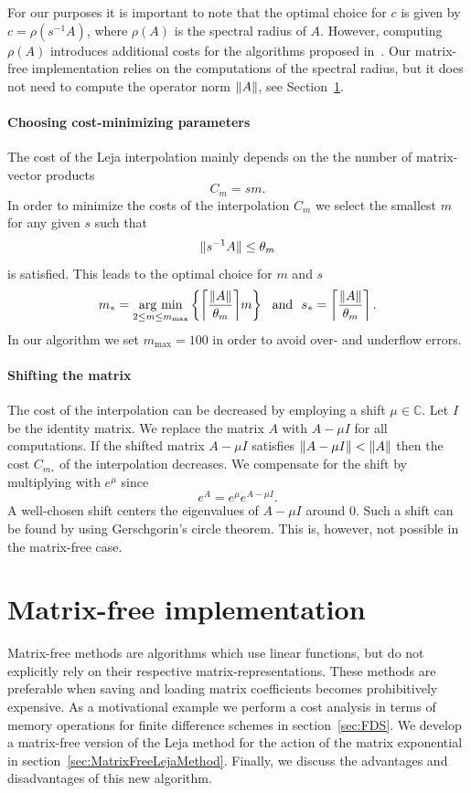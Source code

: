 \documentclass{scrartcl}
\begin{document}
	For our purposes it is important to note that the optimal choice for $c$ is given by $c=\rho(s^{-1}A)$, where $\rho(A)$ is the spectral radius of $A$. However, computing $\rho(A)$ introduces additional costs for the algorithms proposed in~\cite{lejarev}. Our matrix-free implementation relies on the computations of the spectral radius, but it does not need to compute the operator norm $\lVert A\rVert$, see Section~\ref{sec:matrixfreeimplementation}.
	
	\paragraph{Choosing cost-minimizing parameters}
	The cost of the Leja interpolation mainly depends on the the number of matrix-vector products
	\[
	C_{m} = sm. 
	\]
	In order to minimize the costs of the interpolation $C_m$ we select the smallest $m$ for any given $s$ such that
	\[
	\lVert s^{-1}A\rVert \le \theta_m
	\]
	is satisfied. This leads to the optimal choice for $m$ and $s$ 
	\begin{align}
	\begin{split}
	m_* = \underset{2\le m\le m_{\operatorname{max}}}{\operatorname{arg\ min}}  \left\{{\left\lceil{\frac{\norm{A}}{\theta_m}}\right\rceil}m\right\} ~~\text{and}~~
	s_* =  \left\lceil{\frac{\norm{A}}{\theta_m}}\right\rceil.
	\end{split} \label{eq:ms}
	\end{align}
	In our algorithm we set $m_{\operatorname{max}} = 100$ in order to avoid over- and underflow errors.
	
	\paragraph{Shifting the matrix}
	The cost of the interpolation can be decreased by employing a shift $\mu\in\mathbb{C}$. Let $I$ be the identity matrix. We replace the matrix $A$ with $A-\mu I$ for all computations. If the shifted matrix $A-\mu I$ satisfies $\lVert A -\mu I\rVert < \lVert A\rVert$ then the cost $C_{m_*}$ of the interpolation decreases.
	We compensate for the shift by multiplying with $e^\mu$ since
	\[
	e^{A} = e^{\mu}e^{A-\mu I}.
	\]
	A well-chosen shift centers the eigenvalues of $A-\mu I$ around $0$. Such a shift can be found by using Gerschgorin's circle theorem. This is, however, not possible in the matrix-free case.
	
	\section{Matrix-free implementation}\label{sec:matrixfreeimplementation}
Matrix-free methods are algorithms which use linear functions, but do not explicitly rely on their respective matrix-representations. These methods are preferable when saving and loading matrix coefficients becomes prohibitively expensive. As a motivational example we perform a cost analysis in terms of memory operations for finite difference schemes in section~\ref{sec:FDS}.
We develop a matrix-free version of the Leja method for the action of the matrix exponential in section~\ref{sec:MatrixFreeLejaMethod}. Finally, we discuss the advantages and disadvantages of this new algorithm.
\end{document}

